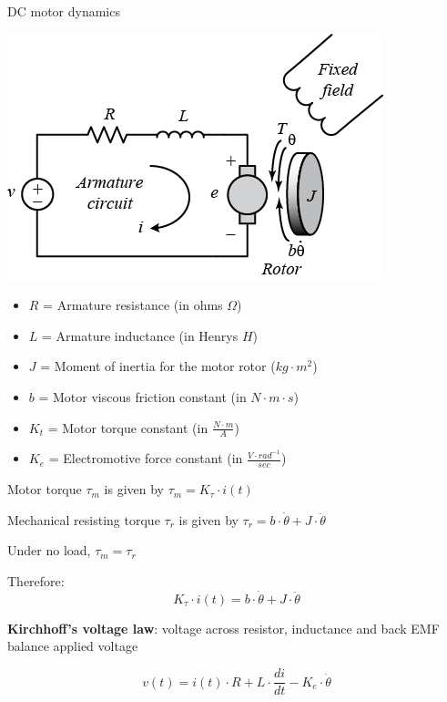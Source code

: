 \documentclass[compress]{beamer}
\begin{document}
\begin{frame}{DC motor dynamics}

    \begin{center}
        \includegraphics[width=0.5\linewidth]{image63}
    \end{center}

 {
\begin{itemize}

\item $R$ = Armature resistance (in ohms $\Omega$)
\item $L$ = Armature inductance (in Henrys $H$) %
\item $J$ = Moment of inertia for the motor rotor ($kg\cdot m^2$)
\item $b$ = Motor viscous friction constant (in $N\cdot m\cdot s$)
\item $K_t$ = Motor torque constant (in $\frac{N\cdot m}{A}$)
\item $K_e$ = Electromotive force constant (in $\frac{V\cdot rad^{-1}}{sec}$) %
\end{itemize}
}

     {
    Motor torque $\tau_m$ is given by $\tau_m = K_\tau \cdot i(t)$

Mechanical resisting torque $\tau_r$ is given by $\tau_r = b \cdot \dot\theta + J \cdot \ddot\theta$

Under no load, $\tau_m = \tau_r$

Therefore:
\[
    K_\tau \cdot i(t) = b \cdot \dot\theta + J \cdot \ddot\theta
\]

}
     {

\textbf{Kirchhoff's voltage law}: voltage across resistor, inductance and
back EMF balance applied voltage

    \[
        v(t) = i(t) \cdot R + L \cdot \frac{di}{dt} - K_e \cdot \dot\theta
    \]
}
\end{frame}
\end{document}
